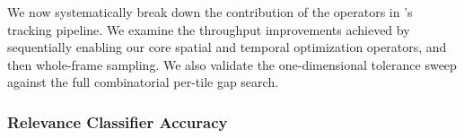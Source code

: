 We now systematically break down the contribution of the operators in \sys{}'s tracking pipeline.
We examine the throughput improvements achieved by sequentially enabling our core spatial and temporal optimization operators,
and then whole-frame sampling.
We also validate the one-dimensional tolerance sweep against the full combinatorial per-tile gap search.

\subsubsection{Relevance Classifier Accuracy}
\label{sec:ablation-classifier}

